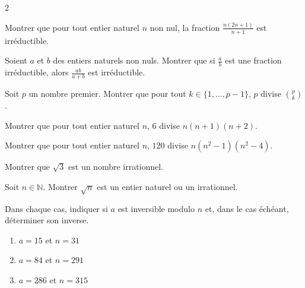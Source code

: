 \documentclass[a4paper,12pt]{article}
\begin{document}
\begin{multicols}{2}
    \begin{exercice}[title=Exercice 17 $\quad \star \star \quad$ { [Raisonner, Chercher] }]{}{}
    Montrer que pour tout entier naturel $n$ non nul, la fraction $\frac{n(2n+1)}{n+1}$ est irréductible.
    \end{exercice}
    
    \begin{exercice}[title=Exercice 18 $\quad \star \star \star \quad$ { [Raisonner, Chercher] }]{}{}
    Soient $a$ et $b$ des entiers naturels non nuls. Montrer que si $\frac{a}{b}$ est une fraction irréductible, alors $\frac{ab}{a+b}$ est irréductible.
    \end{exercice}    
    
\begin{exercice}[title=Exercice 19 $\quad \star\star\star \quad$ { [Raisonner, Chercher] }]{}{}
    Soit $p$ un nombre premier. Montrer que pour tout $k \in \{1, \dots, p-1\}$, $p$ divise $\binom{p}{k}$.
    \end{exercice}
    
    \begin{exercice}[title=Exercice 20 $\quad \star \quad$ { [Calculer, Raisonner] }]{}{}
    Montrer que pour tout entier naturel $n$, $6$ divise $n(n+1)(n+2)$.
    \end{exercice}
    
    \begin{exercice}[title=Exercice 21 $\quad \star \quad$ { [Calculer, Raisonner] }]{}{}
    Montrer que pour tout entier naturel $n$, $120$ divise $n(n^2-1)(n^2-4)$.
    \end{exercice}
    
    \begin{exercice}[title=Exercice 22 $\quad \star\star \quad$ { [Raisonner] }]{}{}
    Montrer que $\sqrt{3}$ est un nombre irrationnel.
    \end{exercice}
    
    \begin{exercice}[title=Exercice 23 $\quad \star\star\star \quad$ { [Chercher, Raisonner, Communiquer] }]{}{}
    Soit $n \in \mathbb{N}$. Montrer $\sqrt{n}$ est un entier naturel ou un irrationnel.
    \end{exercice}
    
    \begin{exercice}[title=Exercice 24 $\quad \star \quad$ { [Calculer] }]{}{}
    Dans chaque cas, indiquer si $a$ est inversible modulo $n$ et, dans le cas échéant, déterminer son inverse.
    \begin{enumerate}
        \item $a = 15$ et $n = 31$
        \item $a = 84$ et $n = 291$
        \item $a = 286$ et $n = 315$
    \end{enumerate}
    \end{exercice}
    

\end{multicols}
\end{document}
